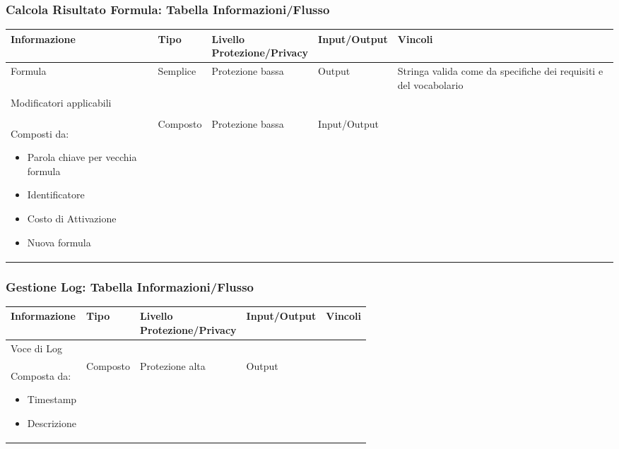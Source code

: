 \documentclass[a4paper, 11pt]{article}
\let\newline\\
\begin{document}
\subsubsection*{Calcola Risultato Formula: Tabella Informazioni/Flusso}
\begin{adjustwidth}{-1.5cm}{-1.5cm}
\begin{center}
    \begin{tabular}{|p{3cm}|p{1.5cm}|p{3.5cm}|p{2.5cm}|p{4cm}|}
        \hline
        \textbf{Informazione} & \textbf{Tipo} & \textbf{Livello \newline Protezione/Privacy} & \textbf{Input/Output}&\textbf{Vincoli}\\
        \hline
        Formula & Semplice & Protezione bassa & Output & Stringa valida come da specifiche dei requisiti e del vocabolario \\\hline
        Modificatori applicabili \newline \newline Composti da:
        \begin{itemize}
            \item Parola chiave per vecchia formula
            \item Identificatore
            \item Costo di Attivazione
            \item Nuova formula
        \end{itemize}& Composto & Protezione bassa & Input/Output & \\\hline
    \end{tabular}
\end{center}
\end{adjustwidth}

\vspace{2em}

\subsubsection*{Gestione Log: Tabella Informazioni/Flusso}
\begin{adjustwidth}{-1.5cm}{-1.5cm}
\begin{center}
    \begin{tabular}{|p{3cm}|p{1.5cm}|p{3.5cm}|p{2.5cm}|p{4cm}|}
        \hline
        \textbf{Informazione} & \textbf{Tipo} & \textbf{Livello \newline Protezione/Privacy} & \textbf{Input/Output}&\textbf{Vincoli}\\
        \hline
        Voce di Log \newline Composta da: \begin{itemize}
            \item Timestamp
            \item Descrizione
        \end{itemize} & Composto & Protezione alta & Output & \\\hline
    \end{tabular}
\end{center}
\end{adjustwidth}
\end{document}
